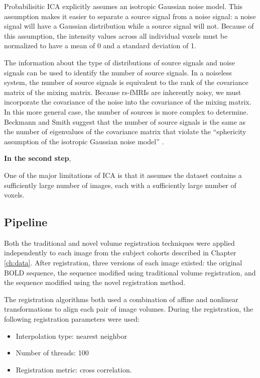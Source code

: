 Probabilisitic ICA explicitly assumes an isotropic Gaussian noise model. This assumption makes it easier to separate a source signal from a noise signal: a noise signal will have a Gaussian distribution while a source signal will not. Because of this assumption, the intensity values across all individual voxels must be normalized to have a mean of 0 and a standard deviation of 1.

The information about the type of distributions of source signals and noise signals can be used to identify the number of source signals. In a noiseless system, the number of source signals is equivalent to the rank of the covariance matrix of the mixing matrix. Because rs-fMRIs are inherently noisy, we must incorporate the covariance of the noise into the covariance of the mixing matrix. In this more general case, the number of sources is more complex to determine. Beckmann and Smith suggest that the number of source signals is the same as the number of eigenvalues of the covariance matrix that violate the ``sphericity assumption of the isotropic Gaussian noise model'' \cite{Beckmann2004}.

\textbf{In the second step}, 

One of the major limitations of ICA is that it assumes the dataset contains a sufficiently large number of images, each with a sufficiently large number of voxels.

  

\subsection{Pipeline}

Both the traditional and novel volume registration techniques were applied independently to each image from the subject cohorts described in Chapter \ref{ch:data}. After registration, three versions of each image existed: the original BOLD sequence, the sequence modified using traditional volume registration, and the sequence modified using the novel registration method.

The registration algorithms both used a combination of affine and nonlinear transformations to align each pair of image volumes. During the registration, the following registration parameters were used:
\begin{itemize}
\item Interpolation type: nearest neighbor
\item Number of threads: 100
\item Registration metric: cross correlation.
\end{itemize}

